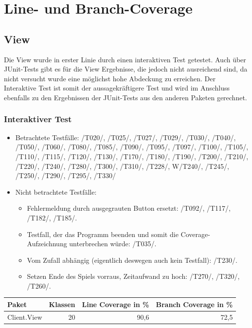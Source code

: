 \documentclass[a4paper]{article}
\begin{document}
\section{Line- und Branch-Coverage}
	\subsection{View}
	Die View wurde in erster Linie durch einen interaktiven Test getestet. Auch über JUnit-Tests gibt es für die View Ergebnisse, die jedoch nicht ausreichend sind, da nicht versucht wurde eine möglichst hohe Abdeckung zu erreichen.
Der Interaktive Test ist somit der aussagekräftigere Test und wird im Anschluss ebenfalls zu den Ergebnissen der JUnit-Tests aus den anderen Paketen gerechnet.
	\subsubsection{Interaktiver Test}
	\begin{itemize}
	\item Betrachtete Testfälle:
	/T020/, /T025/, /T027/, /T029/, /T030/, /T040/, /T050/, /T060/, /T080/, /T085/, /T090/, /T095/, /T097/, /T100/, /T105/, 		/T110/, /T115/, /T120/, /T130/, /T170/, /T180/, /T190/, /T200/, /T210/, /T220/, /T240/, /T280/, /T300/, /T310/, /T228/, 		W/T240/, /T245/,  /T250/, /T290/, /T295/, /T330/  \\
	\item Nicht betrachtete Testfälle: \\
	\begin{itemize}
	\item Fehlermeldung durch ausgegrauten Button ersetzt: /T092/, /T117/, /T182/, /T185/. \\
	\item Testfall, der das Programm beenden und somit die Coverage-Aufzeichnung unterbrechen würde: /T035/. \\
	\item Vom Zufall abhängig (eigentlich deswegen auch kein Testfall): /T230/. \\
	\item Setzen Ende des Spiels vorraus, Zeitaufwand zu hoch: /T270/, /T320/, /T260/. \\
	\end{itemize}
	\end{itemize}
	
	
\noindent
\begin{tabular}{|l|r|r|r|}
\hline
Paket & Klassen & Line Coverage in \% & Branch Coverage in \% \\ \hline \hline
Client.View & \multicolumn{1}{r|}{20} & \multicolumn{1}{r|}{90,6} & \multicolumn{1}{r|}{72,5} \\ \hline
\end{tabular}
\end{document}
